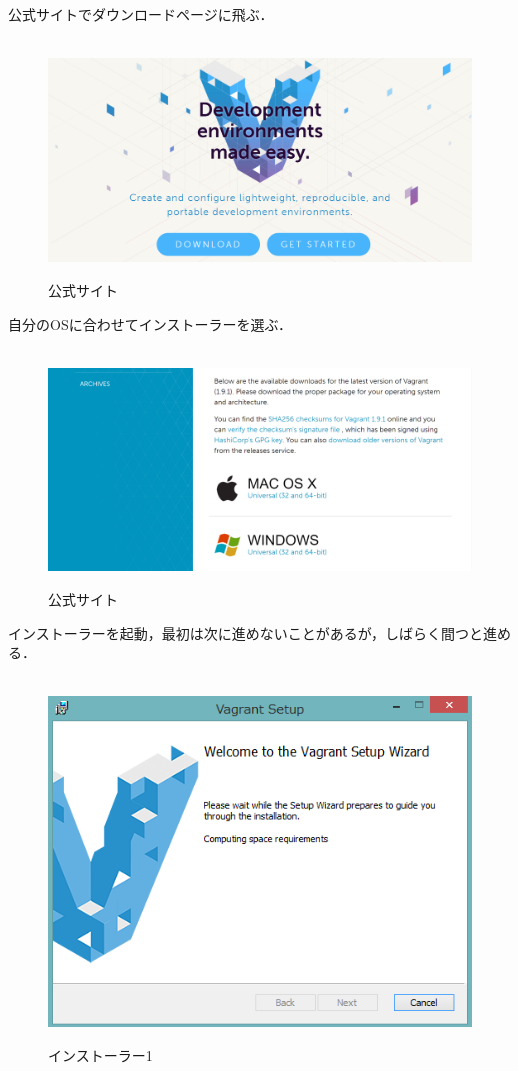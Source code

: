 公式サイトでダウンロードページに飛ぶ．

\begin{figure}[htbp]
\centering　
\includegraphics[width=13cm]{vagrant1.png}
\caption{公式サイト}
\end{figure}

自分のOSに合わせてインストーラーを選ぶ．

\begin{figure}[htbp]
\centering　
\includegraphics[width=13cm]{vagrant2.png}
\caption{公式サイト}
\end{figure}

インストーラーを起動，最初は次に進めないことがあるが，しばらく間つと進める．

\begin{figure}[htbp]
\centering　
\includegraphics[width=13cm]{vagrant3.png}
\caption{インストーラー1}
\end{figure}

